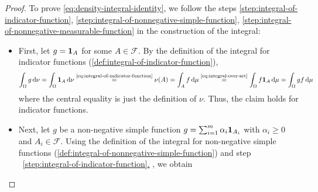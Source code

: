 \begin{proof}
To prove %
\eqref{eq:density-integral-identity}, we follow the steps \ref{step:integral-of-indicator-function}, \ref{step:integral-of-nonnegative-simple-function}, \ref{step:integral-of-nonnegative-measurable-function} in the construction of the integral:
\begin{itemize}[leftmargin=2.0em, labelsep=.5em]
\item[\hypertarget{proofstep:density-integral-indicator-function}{\ref{step:integral-of-indicator-function}.}]
First, let $g = \mathbf{1}_A$ for some $A \in \mathcal{F}$. 
By the definition of the integral for indicator functions (\autoref{def:integral-of-indicator-function}),
\[
\int_{\Omega} g\,\mathrm{d}\nu
=
\int_{\Omega} \mathbf{1}_A\,\mathrm{d}\nu
\overset{\text{\eqref{eq:integral-of-indicator-function}}}{=}
\nu(A)
=
\int_A f\,\mathrm{d}\mu
\overset{\text{\eqref{eq:integral-over-set}}}{=}
\int_{\Omega} f\mathbf{1}_A\,\mathrm{d}\mu
=
\int_{\Omega} gf\,\mathrm{d}\mu
\]
where the central equality is just the definition of $\nu$.
Thus, the claim holds for indicator functions.
\item[\hypertarget{proofstep:density-integral-simple-function}{\ref{step:integral-of-nonnegative-simple-function}.}]
Next, let $g$ be a non-negative simple function
\(
g
=
\sum_{i=1}^m \alpha_i\mathbf{1}_{A_i}
\)
with $\alpha_i \geq 0$ and $A_i \in \mathcal{F}$.
Using the definition of the integral for non-negative simple functions (\autoref{def:integral-of-nonnegative-simple-function}) and step%
~\hyperlink{proofstep:density-integral-indicator-function}{\ref*{step:integral-of-indicator-function}.}%
, we obtain

\end{itemize}
\end{proof}
